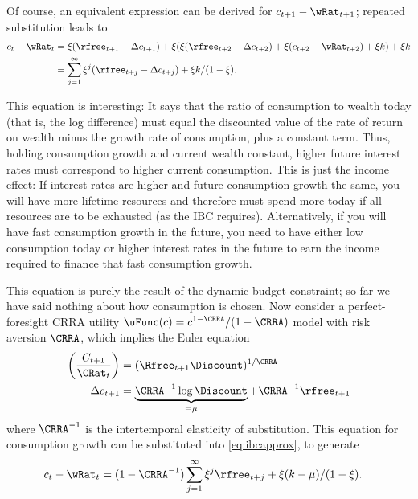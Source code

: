 \documentclass{handout}
\begin{document}
Of course, an equivalent expression can be derived for $c_{t+1}-\wRat_{t+1}$;
repeated substitution leads to
\begin{equation}\begin{gathered}\begin{aligned}
        c_{t}-\wRat_{t} & =  \xi(\rfree_{t+1}-\Delta c_{t+1}) + \xi (\xi (\rfree_{t+2}-\Delta c_{t+2}) + \xi (c_{t+2}-\wRat_{t+2}) + \xi k) + \xi k         \nonumber
\\   & =  \sum_{j=1}^{\infty} \xi^{j}(\rfree_{t+j}-\Delta c_{t+j})+\xi k/(1-\xi). \label{eq:ibcapprox}
\end{aligned}\end{gathered}\end{equation}

This equation is interesting: It says that the ratio of consumption
to wealth today (that is,
the log difference) must equal the discounted value of the rate of
return on wealth minus the growth rate of consumption, plus a constant
term.  Thus, holding consumption growth and current wealth constant,
higher future interest rates must correspond to higher current
consumption.  This is just the income effect: If interest rates are
higher and future consumption growth the same, you will have more
lifetime resources and therefore must spend more today if all
resources are to be exhausted (as the IBC requires).  Alternatively,
if you will have fast consumption growth in the future, you need to
have either low consumption today or higher interest rates in the
future to earn the income required to finance that fast consumption
growth.

This equation is purely the result of the dynamic budget constraint; 
so far we have said nothing about how consumption is chosen.  Now 
consider a perfect-foresight CRRA utility $\uFunc(c)=c^{1-\CRRA}/(1-\CRRA)$ model with risk 
aversion $\CRRA$, which implies the Euler equation
\begin{equation}\begin{gathered}\begin{aligned}
        \left(\frac{{C}_{t+1}}{\CRat_{t}}\right) & =  (\Rfree_{t+1}\Discount)^{1/\CRRA}
\\  \Delta c_{t+1} & =         \underbrace{\CRRA^{-1} \log \Discount}_{\equiv \mu} + \CRRA^{-1} \rfree_{t+1}
\end{aligned}\end{gathered}\end{equation}
where $\CRRA^{-1}$ is the intertemporal elasticity of substitution.  This equation 
for consumption growth can be substituted into \eqref{eq:ibcapprox},
to generate
\begin{equation}\begin{gathered}\begin{aligned}
        c_{t}-\wRat_{t} & =  (1-\CRRA^{-1})\sum_{j=1}^{\infty} \xi^{j}\rfree_{t+j}+\xi (k-\mu)/(1-\xi). \label{eq:cw}
\end{aligned}\end{gathered}\end{equation}
\end{document}
